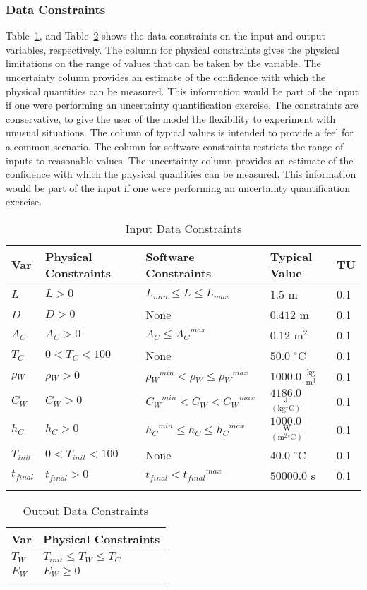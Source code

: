 \documentclass[12pt]{article}
\begin{document}
\subsubsection{Data Constraints}
\label{Sec:DataConstraints}
Table~\ref{Table:InDataConstraints}, and Table~\ref{Table:OutDataConstraints} shows the data constraints on the input and output variables, respectively. The column for physical constraints gives the physical limitations on the range of values that can be taken by the variable. The uncertainty column provides an estimate of the confidence with which the physical quantities can be measured. This information would be part of the input if one were performing an uncertainty quantification exercise. The constraints are conservative, to give the user of the model the flexibility to experiment with unusual situations. The column of typical values is intended to provide a feel for a common scenario. The column for software constraints restricts the range of inputs to reasonable values. The uncertainty column provides an estimate of the confidence with which the physical quantities can be measured. This information would be part of the input if one were performing an uncertainty quantification exercise.
\begin{longtable}{l l l l l}
\toprule
Var & Physical Constraints & Software Constraints & Typical Value & TU
\\
\midrule
$L$ & $L>0$ & ${L_{min}}\leq{}L\leq{}{L_{max}}$ & $1.5$ m & 0.1
\\
$D$ & $D>0$ & None & $0.412$ m & 0.1
\\
${A_{C}}$ & ${A_{C}}>0$ & ${A_{C}}\leq{}{{A_{C}}^{max}}$ & $0.12$ $\text{m}^{2}$ & 0.1
\\
${T_{C}}$ & $0<{T_{C}}<100$ & None & $50.0$ ${}^{\circ}$C & 0.1
\\
${\rho{}_{W}}$ & ${\rho{}_{W}}>0$ & ${{\rho{}_{W}}^{min}}<{\rho{}_{W}}\leq{}{{\rho{}_{W}}^{max}}$ & $1000.0$ $\frac{\text{kg}}{\text{m}^{3}}$ & 0.1
\\
${C_{W}}$ & ${C_{W}}>0$ & ${{C_{W}}^{min}}<{C_{W}}<{{C_{W}}^{max}}$ & $4186.0$ $\frac{\text{J}}{(\text{kg}{}^{\circ}\text{C})}$ & 0.1
\\
${h_{C}}$ & ${h_{C}}>0$ & ${{h_{C}}^{min}}\leq{}{h_{C}}\leq{}{{h_{C}}^{max}}$ & $1000.0$ $\frac{\text{W}}{(\text{m}^{2}{}^{\circ}\text{C})}$ & 0.1
\\
${T_{init}}$ & $0<{T_{init}}<100$ & None & $40.0$ ${}^{\circ}$C & 0.1
\\
${t_{final}}$ & ${t_{final}}>0$ & ${t_{final}}<{{t_{final}}^{max}}$ & $50000.0$ s & 0.1
\\
\bottomrule
\caption{Input Data Constraints}
\label{Table:InDataConstraints}
\end{longtable}
\begin{longtable}{l l}
\toprule
Var & Physical Constraints
\\
\midrule
${T_{W}}$ & ${T_{init}}\leq{}{T_{W}}\leq{}{T_{C}}$
\\
${E_{W}}$ & ${E_{W}}\geq{}0$
\\
\bottomrule
\caption{Output Data Constraints}
\label{Table:OutDataConstraints}
\end{longtable}
\end{document}
